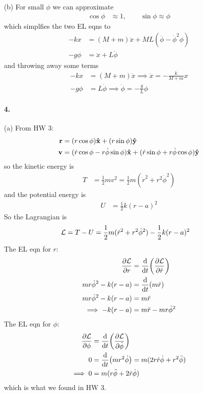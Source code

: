 \documentclass[../hw.tex]{subfiles}
\begin{document}
(b) For small $\phi$ we can approximate
\begin{align*}
    \cos\phi &\approx 1,\qquad \sin\phi \approx \phi 
\end{align*}
which simplfies the two EL eqns to
\begin{align*}
    -kx &= (M + m) \ddot x + ML(\ddot \phi - \dot\phi^2 \phi)\\
    -g\phi &= \ddot x + L\ddot \phi
\end{align*}
and throwing away some terms
\begin{align*}
    -kx &= (M + m)\ddot x \implies \ddot x = -\frac{k}{M + m} x \\
    -g\phi &= L\ddot \phi \implies \ddot \phi = -\frac{g}{L}\phi
\end{align*}

\newpage
\paragraph*{4.} (a) From HW 3:
\begin{align*}
    \vb r &= (r\cos\phi) \vu x + (r\sin\phi) \vu y \\
    \vb v &= (\dot r \cos\phi - r\dot\phi\sin\phi) \vu x + (\dot r \sin\phi + r\dot\phi\cos\phi) \vu y
\end{align*}
so the kinetic energy is
\begin{align*}
    T &= \frac{1}{2} m v^2 = \frac{1}{2} m (\dot r^2 + r^2 \dot\phi^2)
\end{align*}
and the potential energy is
\begin{align*}
    U &= \frac{1}{2} k(r - a)^2
\end{align*}
So the Lagrangian is
\begin{align*}
    \mathcal{L} &= T - U = \frac{1}{2} m (\dot r^2 + r^2 \dot\phi^2) - \frac{1}{2} k(r - a)^2
\end{align*}
The EL eqn for $r$:
\begin{align*}
    \pdv{\mathcal{L}}{r} &= \dv{t}(\pdv{\mathcal{L}}{\dot r}) \\
    mr\dot\phi^2 - k(r - a) &= \dv{t}(m\dot r) \\
    mr\dot\phi^2 - k(r - a) &= m\ddot r \\
    \implies -k(r - a) &= m\ddot r - mr\dot\phi^2
\end{align*}
The EL eqn for $\phi$:
\begin{align*}
    \pdv{\mathcal{L}}{\phi} &= \dv{t}(\pdv{\mathcal{L}}{\dot \phi}) \\
    0 &= \dv{t}(m r^2\dot\phi) = m(2r \dot r \dot\phi + r^2 \ddot\phi) \\
    \implies 0 &= m(r\ddot \phi + 2 \dot r \dot\phi)
\end{align*}
which is what we found in HW 3.
\end{document}
